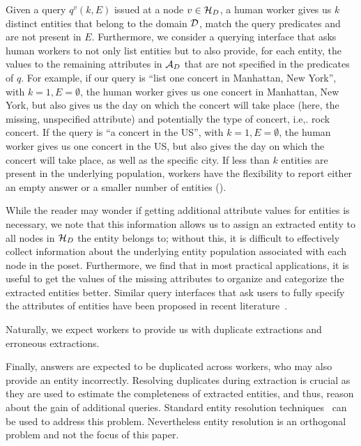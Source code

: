  Given a query $q^v(k, E)$ issued at a node $v \in \mathcal{H}_D$, a human worker gives us $k$ distinct entities that belong to the domain $\mathcal{D}$, match the query predicates and are not present in $E$. Furthermore, we consider a querying interface that asks human workers to not only list entities but to also provide,  for each entity, the values to the remaining attributes in $\mathcal{A}_D$ that are not specified in the predicates of $q$. For example, if our query is ``list one concert in Manhattan, New York'', with $k = 1, E = \emptyset$, the human worker gives us one concert in Manhattan, New York, but also gives us the day on which the concert will take place (here, the missing, unspecified attribute) and potentially the type of concert, i.e,. rock concert. If the query is ``a concert in the US'', with $k = 1, E = \emptyset$, the human worker gives us one concert in the US, but also gives the day on which the concert will take place, as well as the specific city. If less than $k$ entities are present in the underlying population, workers have the flexibility to report either an empty answer or a smaller number of entities ().

While the reader may wonder if getting additional attribute values for entities is necessary, we note that this information allows us to assign an extracted entity to all nodes in $\mathcal{H}_D$ the entity belongs to; without this, it is difficult to effectively collect information about the underlying entity population associated with each node in the poset. Furthermore, we find that in most practical applications, it is useful to get the values of the missing attributes to organize and categorize the extracted entities better. Similar query interfaces that ask users to fully specify the attributes of entities have been proposed in recent literature~\cite{quinn:2014}. 

\ifpaper {} Naturally, we expect workers to provide us with duplicate extractions and erroneous extractions. 

Finally, answers are expected to be duplicated across workers, who may also provide an entity incorrectly. Resolving duplicates during extraction is crucial as they are used to estimate the completeness of extracted entities, and thus, reason about the gain of additional queries. Standard entity resolution techniques~\cite{getoor:kdd13} can be used to address this problem. Nevertheless entity resolution is an orthogonal problem and not the focus of this paper. \fi

